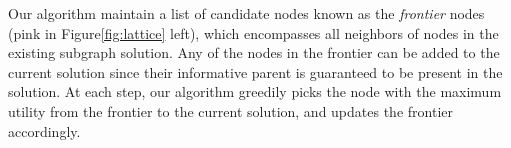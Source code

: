 \par Our algorithm maintain a list of candidate nodes known as the \textit{frontier} nodes (pink in Figure\ref{fig:lattice} left), which encompasses all neighbors of nodes in the existing subgraph solution. Any of the nodes in the frontier can be added to the current solution since their informative parent is guaranteed to be present in the solution. At each step, our algorithm greedily picks the node with the maximum utility from the frontier to the current solution, and updates the frontier accordingly. 

